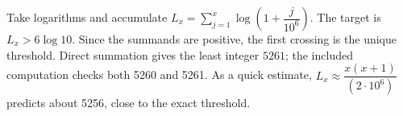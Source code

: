 Take logarithms and accumulate $L_x=\sum_{j=1}^x\log(1+\dfrac{j}{10^6})$. The target is $L_x>6\log10$. Since the summands are positive, the first crossing is the unique threshold. Direct summation gives the least integer $\boxed{5261}$; the included computation checks both 5260 and 5261. As a quick estimate, $L_x\approx \dfrac{x(x+1)}{(2\cdot10^6)}$ predicts about 5256, close to the exact threshold.
